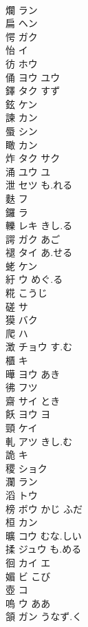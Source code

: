 \documentclass[8pt]{extreport}
\begin{document}
\begin{CJK}{UTF8}{min}
\\	爛	ラン			
\\	扁	ヘン			
\\	愕	ガク			
\\	怡	イ			
\\	彷	ホウ			
\\	俑	ヨウ ユウ			
\\	鐸	タク すず			
\\	鉉	ケン			
\\	諫	カン			
\\	蜃	シン			
\\	瞰	カン			
\\	炸	タク サク			
\\	涌	ユウ ユ			
\\	泄	セツ も.れる			
\\	麩	フ			
\\	鑼	ラ			
\\	轢	レキ きし.る			
\\	諤	ガク あご			
\\	褪	タイ あ.せる			
\\	蛯	ケン			
\\	紆	ウ めぐ.る			
\\	糀	こうじ			
\\	磋	サ			
\\	獏	バク			
\\	爬	ハ			
\\	澂	チョウ す.む					
\\	櫃	キ			
\\	曄	ヨウ あき			
\\	彿	フツ			
\\	齋	サイ とき			
\\	飫	ヨウ ヨ			
\\	頸	ケイ			
\\	軋	アツ きし.む			
\\	詭	キ			
\\	稷	ショク			
\\	瀾	ラン			
\\	滔	トウ			
\\	榜	ボウ かじ ふだ			
\\	桓	カン			
\\	曠	コウ むな.しい			
\\	揉	ジュウ も.める			
\\	徊	カイ エ			
\\	媚	ビ こび			
\\	壺	コ			
\\	嗚	ウ ああ			
\\	頷	ガン うなず.く			

\end{CJK}
\end{document}
